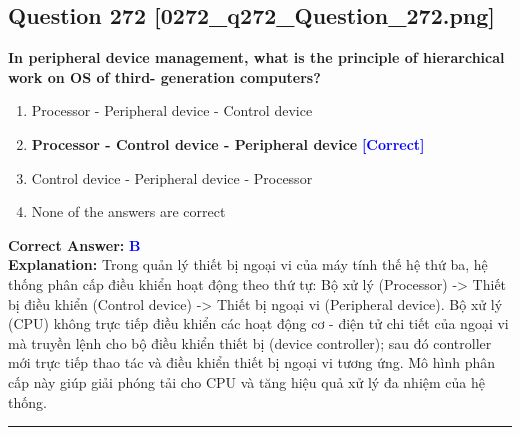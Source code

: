 \documentclass[11pt,a4paper]{article}
\begin{document}
\begin{minipage}{\textwidth}
\subsection*{Question 272 \quad \footnotesize{[0272\_q272\_Question\_272.png]}}
\noindent \textbf{In peripheral device management, what is the principle of hierarchical work on OS of third- generation computers?}

\begin{enumerate}[label=\Alph*.]
    \item Processor - Peripheral device - Control device
    \item \textbf{Processor - Control device - Peripheral device} \hfill \textcolor{blue}{\textbf{[Correct]}}
    \item Control device - Peripheral device - Processor
    \item None of the answers are correct
\end{enumerate}

\noindent \textbf{Correct Answer:} \textcolor{blue}{\textbf{B}} \\[2pt]
\noindent \textbf{Explanation:} Trong quản lý thiết bị ngoại vi của máy tính thế hệ thứ ba, hệ thống phân cấp điều khiển hoạt động theo thứ tự: Bộ xử lý (Processor) -> Thiết bị điều khiển (Control device) -> Thiết bị ngoại vi (Peripheral device). Bộ xử lý (CPU) không trực tiếp điều khiển các hoạt động cơ - điện tử chi tiết của ngoại vi mà truyền lệnh cho bộ điều khiển thiết bị (device controller); sau đó controller mới trực tiếp thao tác và điều khiển thiết bị ngoại vi tương ứng. Mô hình phân cấp này giúp giải phóng tải cho CPU và tăng hiệu quả xử lý đa nhiệm của hệ thống.

\par\vspace{0.3cm}
\hrule
\vspace{0.3cm}
\end{minipage}
\end{document}

